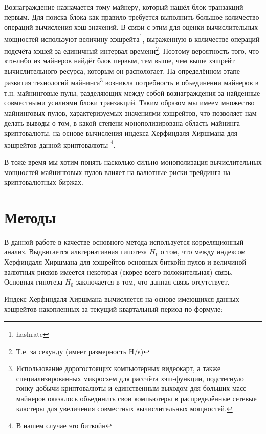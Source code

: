 \documentclass[12pt]{article}
\begin{document}
\par Вознаграждение назначается тому майнеру, который нашёл блок транзакций первым. Для поиска блока как правило требуется выполнить большое количество операций вычисления хэш-значений. В связи с этим для оценки вычислительных мощностей используют величину хэшрейта\footnote{hashrate}, выраженную в количестве операций подсчёта хэшей за единичный интервал времени\footnote{Т.е. за секунду (имеет размерность H/s)}. Поэтому вероятность того, что кто-либо из майнеров найдёт блок первым, тем выше, чем выше хэшрейт вычислительного ресурса, которым он распологает. На определённом этапе развития технологий майнинга\footnote{Использование дорогостоящих компьютерных видеокарт, а также специализированных микросхем для рассчёта хэш-функции, подстегнуло гонку добычи криптовалюты и единственным выходом для больших масс майнеров оказалось объединить свои компьютеры в распределённые сетевые кластеры для увеличения совместных вычислительных мощностей.} возникла потребность в объединении майнеров в т.н. майнинговые пулы, разделяющих между собой вознаграждения за найденные совместными усилиями блоки транзакций. Таким образом мы имеем множество майнинговых пулов, характеризуемых значениями хэшрейтов, что позволяет нам делать выводы о том, в какой степени монополизирована область майнинга криптовалюты, на основе вычисления индекса Херфиндаля-Хиршмана для хэшрейтов данной криптовалюты \footnote{В нашем случае это биткойн}.
\par В тоже время мы хотим понять насколько сильно монополизация вычислительных мощностей майнинговых пулов влияет на валютные риски трейдинга на криптовалютных биржах. 


\section{Методы}

В данной работе в качестве основного метода используется 
корреляционный анализ. Выдвигается альтернативная гипотеза $H_1$ о том, что между индексом Херфиндаля-Хиршмана для хэшрейтов основных биткойн пулов и величиной валютных рисков имеется некоторая (скорее всего положительная) связь. Основная гипотеза $H_0$ заключается в том, что данная связь отсутствует. 

\par Индекс Херфиндаля-Хиршмана вычисляется на основе имеющихся данных хэшрейтов накопленных за текущий квартальный период по формуле:
\end{document}
